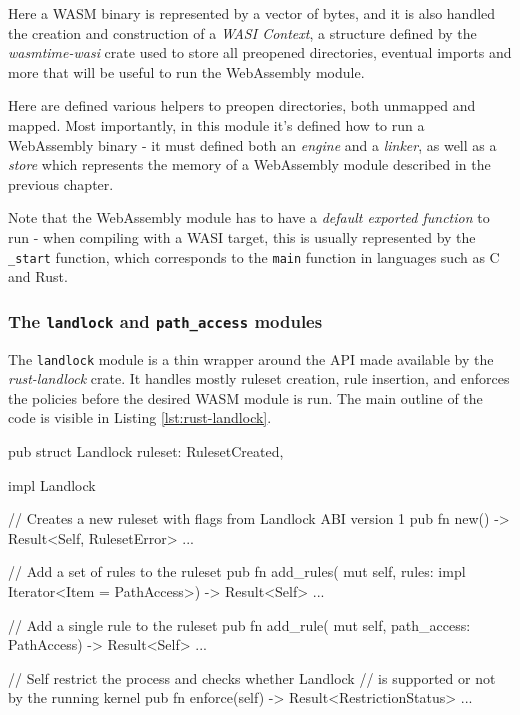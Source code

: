 Here a WASM binary is represented by a vector of bytes, and it is also handled the creation
and construction of a \textit{WASI Context}, a structure defined by the \textit{wasmtime-wasi} crate used to store
all preopened directories, eventual imports and more that will be useful to run the WebAssembly module.

Here are defined various helpers to preopen directories, both unmapped and mapped.
Most importantly, in this module it's defined how to run a WebAssembly binary - it must defined both an \textit{engine} and a \textit{linker},
as well as a \textit{store} which represents the memory of a WebAssembly module described in the previous chapter.

Note that the WebAssembly module has to have a \textit{default exported function} to run - when compiling with a WASI target,
this is usually represented by the \texttt{\_start} function, which corresponds to the \texttt{main} function in languages
such as C and Rust.

\subsubsection{The \texttt{landlock} and \texttt{path\_access} modules}

The \texttt{landlock} module is a thin wrapper around the API made available by the \textit{rust-landlock} crate.
It handles mostly ruleset creation, rule insertion, and enforces the policies before the desired WASM module is run.
The main outline of the code is visible in Listing \ref{lst:rust-landlock}.

\begin{code}[language=Rust, caption=The outline of the \texttt{landlock} module, label=lst:rust-landlock]
  pub struct Landlock {
    ruleset: RulesetCreated,
  }
  
  impl Landlock {
    // Creates a new ruleset with flags from Landlock ABI version 1
    pub fn new() -> Result<Self, RulesetError> {...}
  
    // Add a set of rules to the ruleset
    pub fn add_rules(
      mut self,
      rules: impl Iterator<Item = PathAccess>) -> Result<Self>
    {...}
  
    // Add a single rule to the ruleset
    pub fn add_rule(
      mut self,
      path_access: PathAccess) -> Result<Self>
    {...}
  
    // Self restrict the process and checks whether Landlock
    // is supported or not by the running kernel
    pub fn enforce(self) -> Result<RestrictionStatus> {...}
  }
  \end{code}

